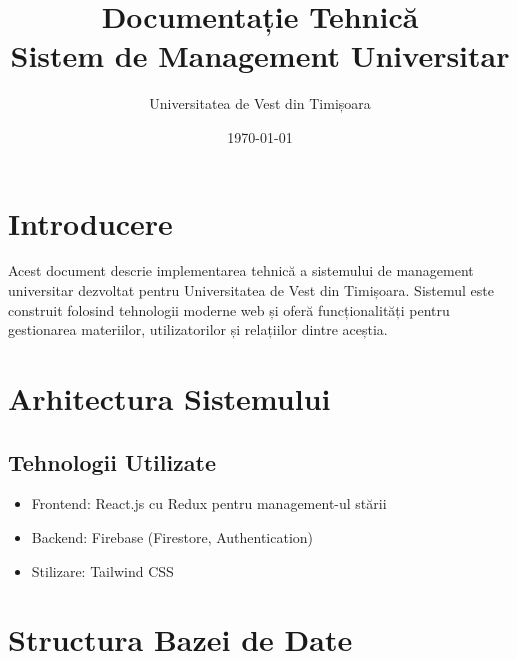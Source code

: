 \documentclass[12pt,a4paper]{article}
\title{Documentație Tehnică\\Sistem de Management Universitar}
\author{Universitatea de Vest din Timișoara}
\date{\today}
\begin{document}
\maketitle
\tableofcontents
\newpage

\section{Introducere}
Acest document descrie implementarea tehnică a sistemului de management universitar dezvoltat pentru Universitatea de Vest din Timișoara. Sistemul este construit folosind tehnologii moderne web și oferă funcționalități pentru gestionarea materiilor, utilizatorilor și relațiilor dintre aceștia.

\section{Arhitectura Sistemului}
\subsection{Tehnologii Utilizate}
\begin{itemize}
    \item Frontend: React.js cu Redux pentru management-ul stării
    \item Backend: Firebase (Firestore, Authentication)
    \item Stilizare: Tailwind CSS
\end{itemize}

\section{Structura Bazei de Date}
\end{document}
